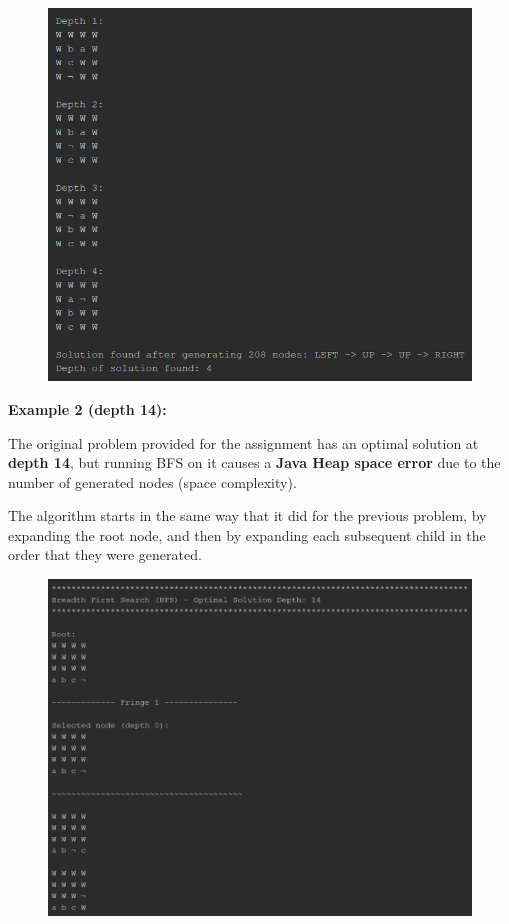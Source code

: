 \documentclass{article}
\begin{document}
	\begin{figure}[h]
		\centering
		\includegraphics[height=0.33\textheight]{BFS-1-6.png}
	\end{figure}
	
	\newpage
	\textbf{Example 2 (depth 14):}
	
	The original problem provided for the assignment has an optimal solution at \textbf{depth 14}, but running BFS on it causes a \textbf{Java Heap space error} due to the number of generated nodes (space complexity).
	
	The algorithm starts in the same way that it did for the previous problem, by expanding the root node, and then by expanding each subsequent child in the order that they were generated.
	
	\begin{figure}[h]	
		\centering
		\includegraphics[width=\textwidth,keepaspectratio]{BFS-2-1.png}
	\end{figure}
\end{document}
